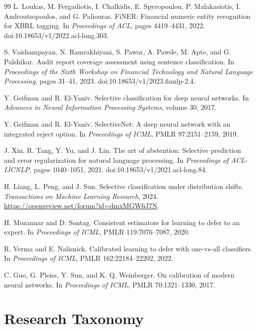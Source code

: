 \documentclass[11pt]{article}
\begin{document}
\begin{thebibliography}{99}
L. Loukas, M. Fergadiotis, I. Chalkidis, E. Spyropoulou, P. Malakasiotis,
I. Androutsopoulos, and G. Paliouras.
FiNER: Financial numeric entity recognition for XBRL tagging. In
\emph{Proceedings of ACL}, pages 4419--4431, 2022.
doi:10.18653/v1/2022.acl-long.303.

S. Vaishampayan, N. Ramrakhiyani, S. Pawar, A. Pawde, M. Apte, and G. Palshikar.
Audit report coverage assessment using sentence classification. In
\emph{Proceedings of the Sixth Workshop on Financial Technology and Natural
Language Processing}, pages 31--41, 2023. doi:10.18653/v1/2023.finnlp-2.4.

Y. Geifman and R. El-Yaniv.
Selective classification for deep neural networks. In \emph{Advances in Neural
Information Processing Systems}, volume 30, 2017.

Y. Geifman and R. El-Yaniv.
SelectiveNet: A deep neural network with an integrated reject option. In
\emph{Proceedings of ICML}, PMLR 97:2151--2159, 2019.

J. Xin, R. Tang, Y. Yu, and J. Lin.
The art of abstention: Selective prediction and error regularization for natural
language processing. In \emph{Proceedings of ACL-IJCNLP}, pages 1040--1051,
2021. doi:10.18653/v1/2021.acl-long.84.

H. Liang, L. Peng, and J. Sun.
Selective classification under distribution shifts.
\emph{Transactions on Machine Learning Research}, 2024.
\url{https://openreview.net/forum?id=dmxMGW6J7N}.

H. Mozannar and D. Sontag.
Consistent estimators for learning to defer to an expert. In
\emph{Proceedings of ICML}, PMLR 119:7076--7087, 2020.

R. Verma and E. Nalisnick.
Calibrated learning to defer with one-vs-all classifiers. In
\emph{Proceedings of ICML}, PMLR 162:22184--22202, 2022.

C. Guo, G. Pleiss, Y. Sun, and K. Q. Weinberger.
On calibration of modern neural networks. In \emph{Proceedings of ICML},
PMLR 70:1321--1330, 2017.

\end{thebibliography}

\appendix

\section{Research Taxonomy}
\label{app:taxonomy}
\end{document}
